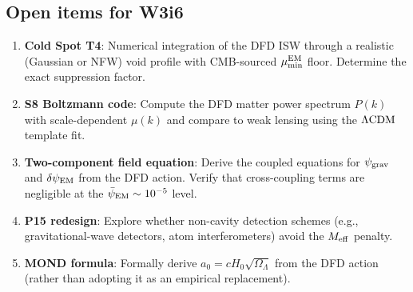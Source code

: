 \documentclass[11pt]{article}
\newcommand{\psiEM}{\bar{\psi}_{\rm EM}}
\newcommand{\Hzero}{H_0}
\newcommand{\LCDM}{\Lambda{\rm CDM}}
\newcommand{\mufd}{\mu}
\newcommand{\mumin}{\mu_{\rm min}}
\begin{document}
\subsection{Open items for W3i6}

\begin{enumerate}[nosep]
  \item \textbf{Cold Spot T4}: Numerical integration of the DFD ISW
    through a realistic (Gaussian or NFW) void profile with CMB-sourced
    $\mumin^{\rm EM}$ floor. Determine the exact suppression factor.
  \item \textbf{S8 Boltzmann code}: Compute the DFD matter power spectrum
    $P(k)$ with scale-dependent $\mufd(k)$ and compare to weak lensing
    using the $\LCDM$ template fit.
  \item \textbf{Two-component field equation}: Derive the coupled equations
    for $\psi_{\rm grav}$ and $\delta\psi_{\rm EM}$ from the DFD action.
    Verify that cross-coupling terms are negligible at the $\psiEM \sim 10^{-5}$
    level.
  \item \textbf{P15 redesign}: Explore whether non-cavity detection schemes
    (e.g., gravitational-wave detectors, atom interferometers) avoid the
    $M_{\rm eff}$ penalty.
  \item \textbf{MOND formula}: Formally derive $a_0 = c\Hzero\sqrt{\Omega_\Lambda}$
    from the DFD action (rather than adopting it as an empirical replacement).
\end{enumerate}
\end{document}
